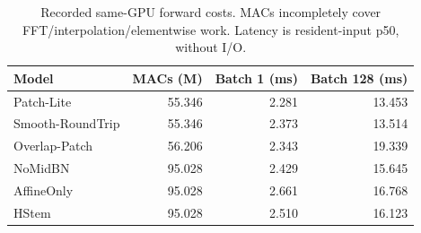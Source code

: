 \begin{table}[t]
\centering\caption{Recorded same-GPU forward costs. MACs incompletely cover FFT/interpolation/elementwise work. Latency is resident-input p50, without I/O.}
\label{tab:costs}
\setlength{\tabcolsep}{4pt}\footnotesize
\begin{tabular}{lrrr}
\toprule Model & MACs (M) & Batch 1 (ms) & Batch 128 (ms)\\\midrule
Patch-Lite & 55.346 & 2.281 & 13.453\\
Smooth-RoundTrip & 55.346 & 2.373 & 13.514\\
Overlap-Patch & 56.206 & 2.343 & 19.339\\
NoMidBN & 95.028 & 2.429 & 15.645\\
AffineOnly & 95.028 & 2.661 & 16.768\\
HStem & 95.028 & 2.510 & 16.123\\
\bottomrule\end{tabular}
\end{table}
